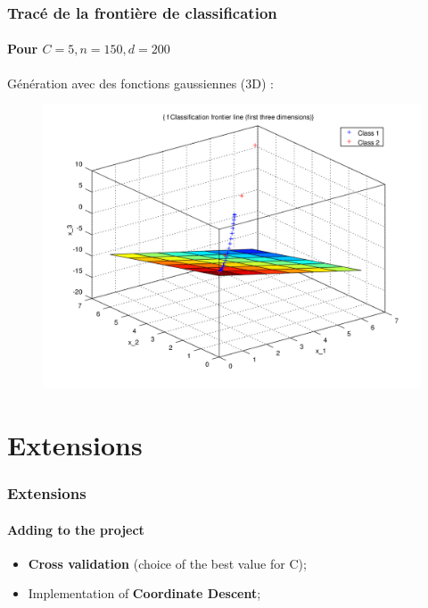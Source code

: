 \documentclass{beamer}
\begin{document}
\begin{frame}
\frametitle{Tracé de la frontière de classification}
\framesubtitle{Pour $C = 5, n = 150, d = 200$}

Génération avec des fonctions gaussiennes (3D) :

         \begin{figure}
         \centering
         \includegraphics[scale=0.4]{images/plane5.png}
         \end{figure}

\end{frame}

\section{Extensions}

\begin{frame}
\tableofcontents[currentsection]
\end{frame}

\begin{frame}
\frametitle{Extensions}
\framesubtitle{Adding to the project}

\begin{itemize}
\item \textbf{Cross validation} (choice of the best value for C);

\bigskip
\pause

\item Implementation of \textbf{Coordinate Descent};

\end{itemize}

\end{frame}
\end{document}
